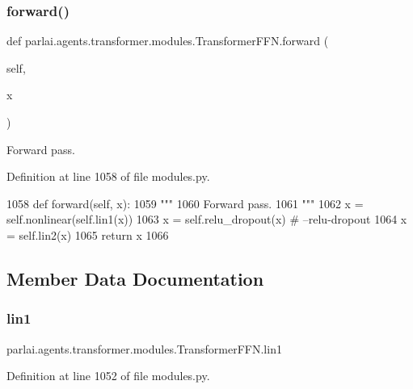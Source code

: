 \subsubsection{\texorpdfstring{forward()}{forward()}}
{\footnotesize\ttfamily def parlai.\+agents.\+transformer.\+modules.\+Transformer\+F\+F\+N.\+forward (\begin{DoxyParamCaption}\item[{}]{self,  }\item[{}]{x }\end{DoxyParamCaption})}

\begin{DoxyVerb}Forward pass.
\end{DoxyVerb}
 

Definition at line 1058 of file modules.\+py.


\begin{DoxyCode}
1058     \textcolor{keyword}{def }forward(self, x):
1059         \textcolor{stringliteral}{"""}
1060 \textcolor{stringliteral}{        Forward pass.}
1061 \textcolor{stringliteral}{        """}
1062         x = self.nonlinear(self.lin1(x))
1063         x = self.relu\_dropout(x)  \textcolor{comment}{# --relu-dropout}
1064         x = self.lin2(x)
1065         \textcolor{keywordflow}{return} x
1066 \end{DoxyCode}


\subsection{Member Data Documentation}
\mbox{\label{classparlai_1_1agents_1_1transformer_1_1modules_1_1TransformerFFN_addc959c81b7c0ba87a47415af7f07e16}} 
\subsubsection{\texorpdfstring{lin1}{lin1}}
{\footnotesize\ttfamily parlai.\+agents.\+transformer.\+modules.\+Transformer\+F\+F\+N.\+lin1}



Definition at line 1052 of file modules.\+py.

